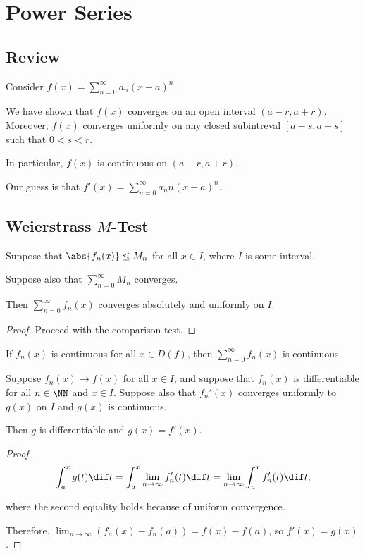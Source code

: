 \documentclass[11pt]{scrartcl}
\begin{document}
\section{Power Series}

\subsection{Review}

Consider $f(x) = \sum_{n=0}^{\infty}a_n(x-a)^n$.

We have shown that $f(x)$ converges on an open interval $(a-r, a+r)$. Moreover, $f(x)$ converges uniformly on any closed subintreval $[a-s, a+s]$ such that $0 < s < r$.

In particular, $f(x)$ is continuous on $(a-r, a+r)$.

Our guess is that $f'(x) = \sum_{n=0}^{\infty}a_nn(x-a)^n$.

\subsection{Weierstrass $M$-Test}

\begin{theorem}
Suppose that $\abs{f_n(x)} \leq M_n$ for all $x\in I$, where $I$ is some interval.

Suppose also that $\sum_{n=0}^{\infty}M_n$ converges.

Then $\sum_{n=0}^{\infty}f_n(x)$ converges absolutely and uniformly on $I$.
\end{theorem}

\begin{proof}
  \hfill

Proceed with the comparison test.
\end{proof}
\begin{lemma}
If $f_n(x)$ is continuous for all $x\in D(f)$, then
$\sum_{n=0}^{\infty}f_n(x)$ is continuous.
\end{lemma}
\begin{theorem}
  Suppose $f_n(x) \to f(x)$ for all $x\in I$, and suppose that
  $f_n(x)$ is differentiable for all $n\in\NN$ and $x\in I$. Suppose
  also that $f_n'(x)$ converges uniformly to $g(x)$ on $I$ and $g(x)$ is continuous.

  Then $g$ is differentiable and $g(x) = f'(x)$.
\end{theorem}

\begin{proof}
  \hfill

  \[\int_a^xg(t)\dif t = \int_a^x\lim_{n\to\infty}f_n'(t)\dif t = \lim_{n\to\infty}\int_a^xf_n'(t)\dif t,\] 

  where the second equality holds because of uniform convergence.

  Therefore, $\lim_{n\to\infty}(f_n(x) - f_n(a)) = f(x)-f(a)$, so
  $f'(x) = g(x)$.
\end{proof}
\end{document}
